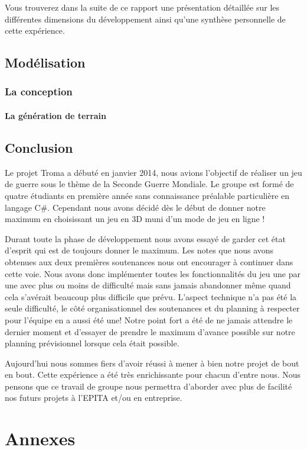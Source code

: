 \documentclass[11pt]{report}
\begin{document}
Vous trouverez dans la suite de ce rapport une présentation détaillée sur les différentes dimensions du développement ainsi qu'une synthèse personnelle de cette expérience.

\chapter{Modélisation}

\section{La conception}



\subsection{La génération de terrain}


\chapter{Conclusion}

Le projet Troma a débuté en janvier 2014, nous avions l'objectif de réaliser un jeu de guerre sous le thème de la Seconde Guerre Mondiale. Le groupe est formé de quatre étudiants en première année sans connaissance préalable particulière en langage C\#. Cependant nous avons décidé dès le début de donner notre maximum en choisissant un jeu en 3D muni d'un mode de jeu en ligne ! 

Durant toute la phase de développement nous avons essayé de garder cet état d'esprit qui est de toujours donner le maximum. Les notes que nous avons obtenues aux deux premières soutenances nous ont encourager à continuer dans cette voie. Nous avons donc implémenter toutes les fonctionnalités du jeu une par une avec plus ou moins de difficulté mais sans jamais abandonner même quand cela s'avérait beaucoup plus difficile que prévu. L'aspect technique n'a pas été la seule difficulté, le côté organisationnel des soutenances et du planning à respecter pour l'équipe en a aussi été une! Notre point fort a été de ne jamais attendre le dernier moment et d'essayer de prendre le maximum d'avance possible sur notre planning prévisionnel lorsque cela était possible.

Aujourd'hui nous sommes fiers d'avoir réussi à mener à bien notre projet de bout en bout. Cette expérience a été très enrichissante pour chacun d'entre nous. Nous pensons que ce travail de groupe nous permettra d'aborder avec plus de facilité nos futurs projets à l'EPITA et/ou en entreprise.

\newpage
{}
\part*{Annexes}

\newpage
\listoffigures

\newpage
\tableofcontents
 
\end{document}
